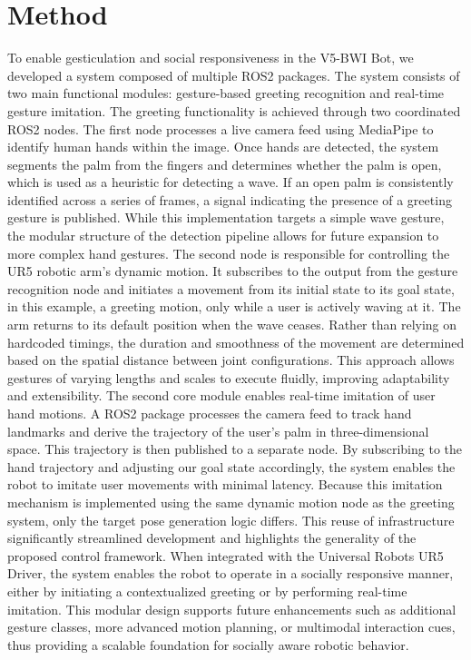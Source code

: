 \documentclass[conference]{IEEEtran}
\begin{document}
\section{Method}
To enable gesticulation and social responsiveness in the V5-BWI Bot, we developed a system composed of multiple ROS2 packages. The system consists of two main functional modules: gesture-based greeting recognition and real-time gesture imitation. The greeting functionality is achieved through two coordinated ROS2 nodes. The first node processes a live camera feed using MediaPipe to identify human hands within the image. Once hands are detected, the system segments the palm from the fingers and determines whether the palm is open, which is used as a heuristic for detecting a wave. If an open palm is consistently identified across a series of frames, a signal indicating the presence of a greeting gesture is published. While this implementation targets a simple wave gesture, the modular structure of the detection pipeline allows for future expansion to more complex hand gestures. The second node is responsible for controlling the UR5 robotic arm's dynamic motion. It subscribes to the output from the gesture recognition node and initiates a movement from its initial state to its goal state, in this example, a greeting motion, only while a user is actively waving at it. The arm returns to its default position when the wave ceases. Rather than relying on hardcoded timings, the duration and smoothness of the movement are determined based on the spatial distance between joint configurations. This approach allows gestures of varying lengths and scales to execute fluidly, improving adaptability and extensibility. The second core module enables real-time imitation of user hand motions. A ROS2 package processes the camera feed to track hand landmarks and derive the trajectory of the user’s palm in three-dimensional space. This trajectory is then published to a separate node. By subscribing to the hand trajectory and adjusting our goal state accordingly, the system enables the robot to imitate user movements with minimal latency. Because this imitation mechanism is implemented using the same dynamic motion node as the greeting system, only the target pose generation logic differs. This reuse of infrastructure significantly streamlined development and highlights the generality of the proposed control framework. When integrated with the Universal Robots UR5 Driver, the system enables the robot to operate in a socially responsive manner, either by initiating a contextualized greeting or by performing real-time imitation. This modular design supports future enhancements such as additional gesture classes, more advanced motion planning, or multimodal interaction cues, thus providing a scalable foundation for socially aware robotic behavior.
\end{document}
